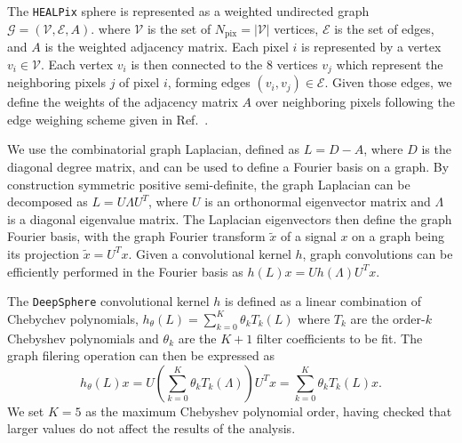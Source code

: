 \documentclass[prd,aps,10pt,nofootinbib,twocolumn,superscriptaddress,preprintnumbers,balancelastpage,longbibliography]{revtex4-1}
\begin{document}
The \texttt{HEALPix} sphere is represented as a weighted undirected graph $\mathcal G = (\mathcal V, \mathcal E, A)$.  where $\mathcal V$ is the set of $N_\mathrm{pix} = |\mathcal V|$ vertices, $\mathcal E$ is the set of edges, and $A$ is the weighted adjacency matrix. Each pixel $i$ is represented by a vertex $v_i \in \mathcal V$. Each vertex $v_i$ is then connected to the 8 %
vertices $v_j$ which represent the neighboring pixels $j$ of pixel $i$, forming edges $(v_i
, v_j) \in \mathcal E$. Given those edges, we define the weights of the adjacency matrix $ A$ over neighboring pixels following the edge weighing scheme given in Ref.~\cite{defferrard2020deepsphere}.

We use the combinatorial graph Laplacian, defined as $ L =  D -  A$, where $ D$ is the diagonal degree matrix, and can be used to define a Fourier basis on a graph. By construction symmetric positive semi-definite, the graph Laplacian can be decomposed as $ L =  U  \Lambda  U^T$, where $ U$ is an orthonormal eigenvector matrix and $ \Lambda$ is a diagonal eigenvalue matrix. The Laplacian eigenvectors then define the graph Fourier basis, with the graph Fourier transform $\tilde{ x}$ of a signal $ x$ on a graph being its projection $\tilde{x} =  U^T  x$.
Given a convolutional kernel $h$, graph convolutions can be efficiently performed in the Fourier basis as $h({L}) {x}={U} h({\Lambda}) {U}^{T} {x}$.

The \texttt{DeepSphere} convolutional kernel $h$ is defined as a linear combination of Chebychev polynomials, $h_{\theta}({{L}}) = \sum_{k=0}^{K} \theta_{k} T_{k}({{L}})$ where $T_k$ are the order-$k$ Chebyshev polynomials and $\theta_k$ are the $K + 1$ filter coefficients to be fit. The graph filering operation can then be expressed as
\begin{equation}
    h_{\theta}({L}) {x}={U}\left(\sum_{k=0}^{K} \theta_{k} T_k({\Lambda})\right) {U}^{T} {x}=\sum_{k=0}^{K} \theta_{k} T_k({L}) {x}.
\end{equation}
We set $K=5$ as the maximum Chebyshev polynomial order, having checked that larger values do not affect the results of the analysis.
\end{document}
